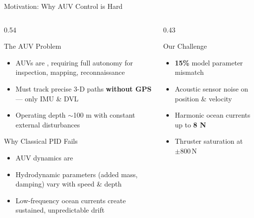 \documentclass[aspectratio=169,10pt]{beamer}
\begin{document}
\begin{frame}{Motivation: Why AUV Control is Hard}

\begin{columns}[T]
\begin{column}{0.54\textwidth}
  \begin{block}{The AUV Problem}
    \begin{itemize}
      \item AUVs are , requiring full autonomy for
            inspection, mapping, reconnaissance
      \item Must track precise 3-D paths \textbf{without GPS} — only IMU \& DVL
      \item Operating depth \(\sim\)100 m with constant external disturbances
    \end{itemize}
  \end{block}
  \vspace{6pt}
  \begin{alertblock}{Why Classical PID Fails}
    \begin{itemize}
      \item AUV dynamics are 
      \item Hydrodynamic parameters (added mass, damping) vary with speed \& depth
      \item Low-frequency ocean currents create sustained, unpredictable drift
    \end{itemize}
  \end{alertblock}
\end{column}
\begin{column}{0.43\textwidth}
  \begin{exampleblock}{Our Challenge}
    \begin{itemize}
      \item \textbf{15\%} model parameter mismatch
      \item Acoustic sensor noise on position \& velocity
      \item Harmonic ocean currents up to \textbf{8 N}
      \item Thruster saturation at \(\pm 800\,\text{N}\)
    \end{itemize}
  \end{exampleblock}
  \vspace{8pt}
\end{column}
\end{columns}
\end{frame}
\end{document}
